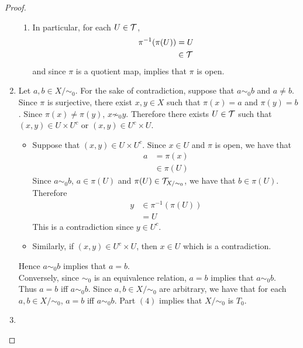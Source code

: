 \documentclass{book}
\begin{document}
\begin{proof}
\begin{enumerate}
\begin{enumerate}
				\item In particular, for each $U \in \mathcal{T}$, 
				\begin{align*}
					\pi^{-1}(\pi(U)) 
					& = U \\
					& \in \mathcal{T} 
				\end{align*}
				and since $\pi$ is a quotient map,  implies that $\pi$ is open. 
			\end{enumerate}
		
		
			\item 	Let $a,b \in X / \sim_0$. For the sake of contradiction, suppose that $a \sim_0 b$ and $a \neq b$. Since $\pi$ is surjective, there exist $x,y \in X$ such that $\pi(x) = a$ and $\pi(y) = b$. Since $\pi(x) \neq \pi(y)$, $x \not \sim_0 y$. Therefore there exists $U \in \mathcal{T}$ such that $(x,y) \in U \times U^c$ or $(x,y) \in U^c \times U$. 
			\begin{itemize}
				\item Suppose that $(x,y) \in U \times U^c$. Since $x \in U$ and $\pi$ is open, we have that
				\begin{align*}
					a
					& = \pi(x) \\
					& \in \pi(U)
				\end{align*}
				Since $a \sim_0 b$, $a \in \pi(U)$ and $\pi(U) \in \mathcal{T}_{X/\sim_0}$, we have that $b \in \pi(U)$. Therefore 
				\begin{align*}
					y 
					& \in \pi^{-1}(\pi(U)) \\
					& = U
				\end{align*}
				This is a contradiction since $y \in U^c$. 
				\item Similarly, if $(x,y) \in U^c \times U$, then $x \in U$ which is a contradiction. 
			\end{itemize}
			Hence $a \sim_0 b$ implies that $a = b$. \\
			Conversely, since $\sim_0$ is an equivalence relation, $a = b$ implies that $a \sim_0 b$. \\
			Thus $a = b$ iff $a \sim_0 b$. Since $a, b \in X/\sim_0$ are arbitrary, we have that for each $a,b \in X/\sim_0$, $a = b$ iff $a \sim_0 b$. Part $(4)$ implies that $X / \sim_0$ is $T_0$.
			\item {}
		\end{enumerate}
	\end{proof}
	
\end{document}
